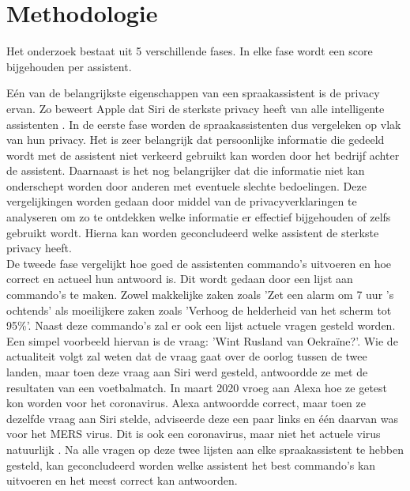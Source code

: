 \documentclass{hogent-article}
\begin{document}
\section{Methodologie}


Het onderzoek bestaat uit 5 verschillende fases. In elke fase wordt een score bijgehouden per assistent.

Eén van de belangrijkste eigenschappen van een spraakassistent is de privacy ervan. Zo beweert Apple dat Siri de sterkste privacy heeft van alle intelligente assistenten \autocite{Apple}. In de eerste fase worden de spraakassistenten dus vergeleken op vlak van hun privacy. Het is zeer belangrijk dat persoonlijke informatie die gedeeld wordt met de assistent niet verkeerd gebruikt kan worden door het bedrijf achter de assistent. Daarnaast is het nog belangrijker dat die informatie niet kan onderschept worden door anderen met eventuele slechte bedoelingen. Deze vergelijkingen worden gedaan door middel van de privacyverklaringen te analyseren om zo te ontdekken welke informatie er effectief bijgehouden of zelfs gebruikt wordt. Hierna kan worden geconcludeerd welke assistent de sterkste privacy heeft.
\\\indent
De tweede fase vergelijkt hoe goed de assistenten commando's uitvoeren en hoe correct en actueel hun antwoord is. Dit wordt gedaan door een lijst aan commando's te maken. Zowel makkelijke zaken zoals 'Zet een alarm om 7 uur 's ochtends' als moeilijkere zaken zoals 'Verhoog de helderheid van het scherm tot 95\%'. Naast deze commando's zal er ook een lijst actuele vragen gesteld worden. Een simpel voorbeeld hiervan is de vraag: 'Wint Rusland van Oekraïne?'. Wie de actualiteit volgt zal weten dat de vraag gaat over de oorlog tussen de twee landen, maar toen deze vraag aan Siri werd gesteld, antwoordde ze met de resultaten van een voetbalmatch. In maart 2020 vroeg \textcite{Heilweil2020} aan Alexa hoe ze getest kon worden voor het coronavirus. Alexa antwoordde correct, maar toen ze dezelfde vraag aan Siri stelde, adviseerde deze een paar links en één daarvan was voor het MERS virus. Dit is ook een coronavirus, maar niet het actuele virus natuurlijk \autocite{Heilweil2020}. Na alle vragen op deze twee lijsten aan elke spraakassistent te hebben gesteld, kan geconcludeerd worden welke assistent het best commando's kan uitvoeren en het meest correct kan antwoorden.
\end{document}
